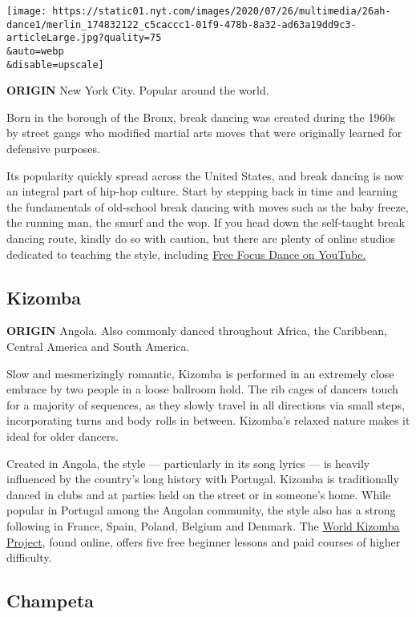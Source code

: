 \texttt{[image: https://static01.nyt.com/images/2020/07/26/multimedia/26ah-dance1/merlin\_174832122\_c5caccc1-01f9-478b-8a32-ad63a19dd9c3-articleLarge.jpg?quality=75\\\&auto=webp\\\&disable=upscale]}

\textbf{ORIGIN} New York City. Popular around the world.

Born in the borough of the Bronx, break dancing was created during the
1960s by street gangs who modified martial arts moves that were
originally learned for defensive purposes.

Its popularity quickly spread across the United States, and break
dancing is now an integral part of hip-hop culture. Start by stepping
back in time and learning the fundamentals of old-school break dancing
with moves such as the baby freeze, the running man, the smurf and the
wop. If you head down the self-taught break dancing route, kindly do so
with caution, but there are plenty of online studios dedicated to
teaching the style, including
\href{https://www.youtube.com/channel/UCo7SFDRvz0R7XDzM9pN1JCg}{Free
Focus Dance on YouTube.}

\hypertarget{kizomba}{%
\subsection{Kizomba}\label{kizomba}}

\textbf{ORIGIN} Angola. Also commonly danced throughout Africa, the
Caribbean, Central America and South America.

Slow and mesmerizingly romantic, Kizomba is performed in an extremely
close embrace by two people in a loose ballroom hold. The rib cages of
dancers touch for a majority of sequences, as they slowly travel in all
directions via small steps, incorporating turns and body rolls in
between. Kizomba's relaxed nature makes it ideal for older dancers.

Created in Angola, the style --- particularly in its song lyrics --- is
heavily influenced by the country's long history with Portugal. Kizomba
is traditionally danced in clubs and at parties held on the street or in
someone's home. While popular in Portugal among the Angolan community,
the style also has a strong following in France, Spain, Poland, Belgium
and Denmark. The \href{https://www.worldkizombaproject.com/}{World
Kizomba Project}, found online, offers five free beginner lessons and
paid courses of higher difficulty.

\hypertarget{champeta}{%
\subsection{Champeta}\label{champeta}}

